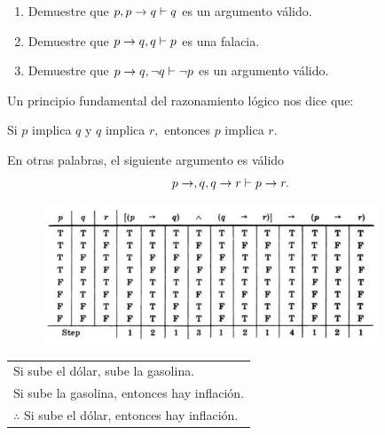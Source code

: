 \documentclass[xcolor={svgnames},
  hyperref={colorlinks}, 
  spanish, 12pt]{beamer}
\numberwithin{equation}{section} %
\numberwithin{figure}{section} %
\begin{document}
\begin{frame}
 \begin{exmp}
 \label{lip:exmp:4.4}
  \begin{enumerate}
   \item Demuestre que $p, p\rightarrow q \vdash q$ es un argumento v\'alido. \pause
   \item Demuestre que $p\rightarrow q, q \vdash p$ es una falacia.
   \pause
   \item Demuestre que $p\rightarrow q, \neg q \vdash \neg p$ es un argumento v\'alido.
  \end{enumerate}

 \end{exmp}

\end{frame}

\begin{frame}
 \begin{exmp}
  Un principio fundamental del razonamiento l\'ogico nos dice que:
  \begin{center}
   Si $p$ implica $q$ y $q$ implica $r,$ entonces $p$ implica $r.$ 
  \end{center}
\pause

En otras palabras, el siguiente argumento es v\'alido
$$
p\rightarrow,q, q\rightarrow r \vdash p \rightarrow r.
$$ \pause
 \end{exmp}

\end{frame}

\begin{frame}
 \begin{figure}
 \centering
 \includegraphics[width=10cm,keepaspectratio=true]{./tabla_silogismo.png}
 \label{fig:tabla_silogismo}
\end{figure}

\end{frame}

\begin{frame}
\begin{exmp}
  \begin{center}
\begin{tabular}{l}
Si sube el d\'olar, sube la gasolina.\\
Si sube la gasolina, entonces hay inflaci\'on.\\\hline
$\therefore$ Si sube el d\'olar, entonces hay inflaci\'on.
 \end{tabular}
 \end{center}
\end{exmp}
\end{frame}
\end{document}

